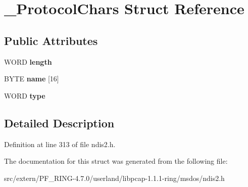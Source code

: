 \hypertarget{struct___protocol_chars}{
\section{\_\-ProtocolChars Struct Reference}
\label{struct___protocol_chars}
}
\subsection*{Public Attributes}
\begin{DoxyCompactItemize}
\item 
\hypertarget{struct___protocol_chars_aec0926cd93eee4a091b4fba71b761206}{
WORD {\bfseries length}}
\label{struct___protocol_chars_aec0926cd93eee4a091b4fba71b761206}

\item 
\hypertarget{struct___protocol_chars_ae43120077ce9d814a52d6bf8825035d8}{
BYTE {\bfseries name} \mbox{[}16\mbox{]}}
\label{struct___protocol_chars_ae43120077ce9d814a52d6bf8825035d8}

\item 
\hypertarget{struct___protocol_chars_a9a11a536af86fb655c26fc714ee4a683}{
WORD {\bfseries type}}
\label{struct___protocol_chars_a9a11a536af86fb655c26fc714ee4a683}

\end{DoxyCompactItemize}


\subsection{Detailed Description}


Definition at line 313 of file ndis2.h.



The documentation for this struct was generated from the following file:\begin{DoxyCompactItemize}
\item 
src/extern/PF\_\-RING-\/4.7.0/userland/libpcap-\/1.1.1-\/ring/msdos/ndis2.h\end{DoxyCompactItemize}
